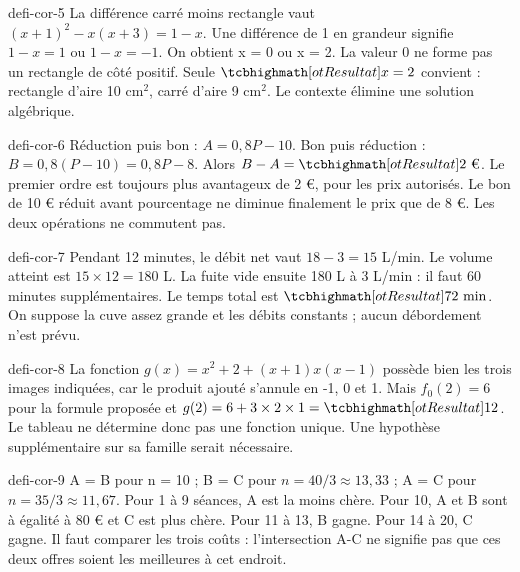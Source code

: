 \begin{blocEdition}{defi-cor-5}
La différence carré moins rectangle vaut $(x+1)^2-x(x+3)=1-x$. Une différence de 1 en grandeur signifie $1-x=1$ ou $1-x=-1$. On obtient x = 0 ou x = 2. La valeur 0 ne forme pas un rectangle de côté positif. Seule $\res{x=2}$ convient : rectangle d’aire 10 cm$^2$, carré d’aire 9 cm$^2$. Le contexte élimine une solution algébrique.
\end{blocEdition}
\begin{blocEdition}{defi-cor-6}
Réduction puis bon : $A=0{,}8P-10$. Bon puis réduction : $B=0{,}8(P-10)=0{,}8P-8$. Alors $B-A=\res{2\text{ €}}$. Le premier ordre est toujours plus avantageux de 2 €, pour les prix autorisés. Le bon de 10 € réduit avant pourcentage ne diminue finalement le prix que de 8 €. Les deux opérations ne commutent pas.
\end{blocEdition}
\begin{blocEdition}{defi-cor-7}
Pendant 12 minutes, le débit net vaut $18-3=15$ L/min. Le volume atteint est $15\times12=180$ L. La fuite vide ensuite 180 L à 3 L/min : il faut 60 minutes supplémentaires. Le temps total est $\res{72\text{ min}}$. On suppose la cuve assez grande et les débits constants ; aucun débordement n’est prévu.
\end{blocEdition}
\begin{blocEdition}{defi-cor-8}
La fonction $g(x)=x^2+2+(x+1)x(x-1)$ possède bien les trois images indiquées, car le produit ajouté s’annule en -1, 0 et 1. Mais $f_0(2)=6$ pour la formule proposée et $g(2)=6+3\times2\times1=\res{12}$. Le tableau ne détermine donc pas une fonction unique. Une hypothèse supplémentaire sur sa famille serait nécessaire.
\end{blocEdition}
\begin{blocEdition}{defi-cor-9}
A = B pour n = 10 ; B = C pour $n=40/3\approx13{,}33$ ; A = C pour $n=35/3\approx11{,}67$. Pour 1 à 9 séances, A est la moins chère. Pour 10, A et B sont à égalité à 80 € et C est plus chère. Pour 11 à 13, B gagne. Pour 14 à 20, C gagne. Il faut comparer les trois coûts : l’intersection A-C ne signifie pas que ces deux offres soient les meilleures à cet endroit.
\end{blocEdition}
